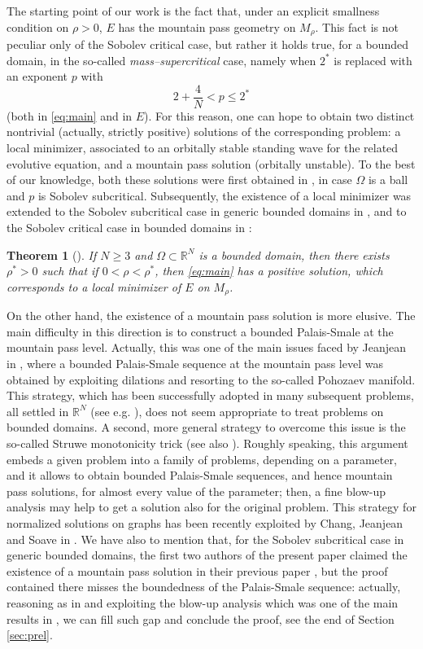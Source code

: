 \documentclass[10pt]{article}
\newcommand{\R}{\mathbb{R}}
\newtheorem{theorem}[proposition]{Theorem}
\theoremstyle{definition}
\numberwithin{equation}{section}
\begin{document}
The starting point of our work is the fact that, under an explicit smallness 
condition on $\rho>0$,  $E$ has the mountain pass geometry on $M_\rho$. This fact 
is not peculiar only of the Sobolev critical case, but rather it holds true, for a 
bounded domain, in the so-called \emph{mass--supercritical} case, namely when $2^*$ 
is replaced with an exponent $p$ with
\[
2+\frac4N < p \le 2^*
\]
(both in \eqref{eq:main} and in $E$). For this reason, one can hope to obtain two 
distinct nontrivial (actually, strictly positive) solutions of the corresponding problem: a local minimizer, associated to an orbitally stable standing wave for the related evolutive equation, 
and a mountain pass solution (orbitally unstable). To the best of our knowledge, 
both these solutions were first obtained in \cite{ntvAnPDE}, in case $\Omega$ is a 
ball and $p$ is Sobolev subcritical. Subsequently, the existence of a local minimizer 
was extended to the Sobolev subcritical case in generic bounded domains in 
\cite{MR3689156}, and to the Sobolev critical case in bounded domains in 
\cite{MR3918087}:
%
\begin{theorem}[{\cite[Thm. 1.11]{MR3918087}}]\label{Th:mini}
If $N\geq3$ and $\Omega\subset\R^N$ is a bounded domain, then there exists  
$\rho^{*}>0$ such that if $0<\rho<\rho^{*}$, then \eqref{eq:main} has a positive solution, 
which corresponds to a local minimizer of $E$ on $M_{\rho}$.
\end{theorem}

On the other hand, the existence of a mountain pass solution is  
more elusive. The main difficulty in this direction is to construct a bounded  
Palais-Smale at the mountain pass level. Actually, this was one of the main issues 
faced by Jeanjean in \cite{MR1430506}, where a bounded Palais-Smale sequence at 
the mountain pass level was obtained by exploiting dilations and resorting to the 
so-called  Pohozaev manifold. This strategy, which has been successfully adopted 
in many subsequent problems, all settled in $\R^N$ (see e.g. 
\cite{MR3639521,MR4107073,MR4096725,MR4304693,MR4443784}), does not seem appropriate 
to treat problems on bounded domains. A second, more general strategy to overcome this 
issue is the so-called Struwe monotonicity trick \cite{MR970849,MR926524} 
(see also \cite{JJ_BPS}). Roughly speaking, this argument embeds a given problem into 
a family of problems, depending on a parameter, and it allows to obtain 
bounded Palais-Smale sequences, and hence mountain pass solutions, for almost every value 
of the parameter; then, a fine blow-up analysis may help to get a solution also for the 
original problem. This strategy for normalized solutions on graphs 
has been recently exploited by Chang, Jeanjean and Soave in \cite{JJS_graph_IHP}. 
We have also to mention that, for the Sobolev subcritical case in generic bounded 
domains, the first two authors of the present paper claimed the existence of a mountain pass solution 
in their previous paper \cite[Proposition 4.4]{MR3689156}, but the proof contained there misses  
the boundedness of the Palais-Smale sequence: actually, reasoning as in \cite{JJS_graph_IHP}
and exploiting the blow-up analysis which was one of the main results in \cite{MR3689156}, we 
can fill such gap and conclude the proof, see the end of Section \ref{sec:prel}.
\end{document}
